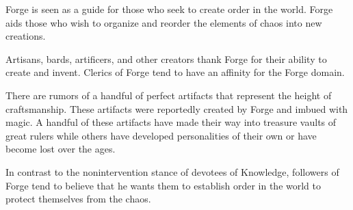 Forge is seen as a guide for those who seek to create order in the world.
Forge aids those who wish to organize and reorder the elements of chaos into new creations.

Artisans, bards, artificers, and other creators thank Forge for their ability to create and invent.
Clerics of Forge tend to have an affinity for the Forge domain.

There are rumors of a handful of perfect artifacts that represent the height of craftsmanship.
These artifacts were reportedly created by Forge and imbued with magic.
A handful of these artifacts have made their way into treasure vaults of great rulers while others have developed personalities of their own or have become lost over the ages.

In contrast to the nonintervention stance of devotees of Knowledge, followers of Forge tend to believe that he wants them to establish order in the world to protect themselves from the chaos.
